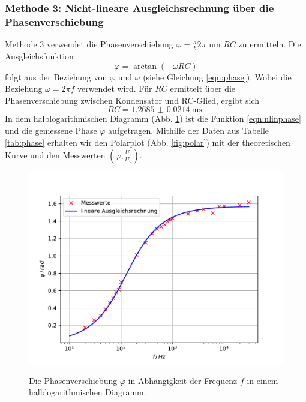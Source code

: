 \subsubsection{Methode 3: Nicht-lineare Ausgleichsrechnung über die Phasenverschiebung}
Methode 3 verwendet die Phasenverschiebung $\varphi = \frac{a}{b}2\pi$ um $RC$ zu ermitteln.
Die Ausgleichsfunktion
\begin{equation}
    \varphi = \arctan(-\omega RC)
    \label{eqn:nlinphase}
\end{equation}
folgt aus der Beziehung von $\varphi$ und $\omega$ (siehe Gleichung \ref{eqn:phase}).
Wobei die Beziehung $\omega = 2\pi f$ verwendet wird.
Für $RC$ ermittelt über die Phasenverschiebung zwischen Kondensator und RC-Glied, ergibt sich
\begin{equation*}
    RC = \SI{1.2685(214)}{\milli\second} .
\end{equation*}
In dem halblogarithmischen Diagramm (Abb. \ref{fig:phase}) ist die Funktion \ref{eqn:nlinphase} und die gemessene Phase $\varphi$ aufgetragen.
Mithilfe der Daten aus Tabelle \ref{tab:phase} erhalten wir den Polarplot (Abb. \ref{fig:polar}) mit der theoretischen Kurve und den Messwerten $(\varphi, \frac{U_\text{c}}{U_0})$.
\begin{figure}
    \centering
    \includegraphics[width=\textwidth]{content/data/plotc.pdf}
    \label{fig:phase}
    \caption{Die Phasenverschiebung $\varphi$ in Abhängigkeit der Frequenz $f$ in einem halblogarithmischen Diagramm.}
\end{figure}

